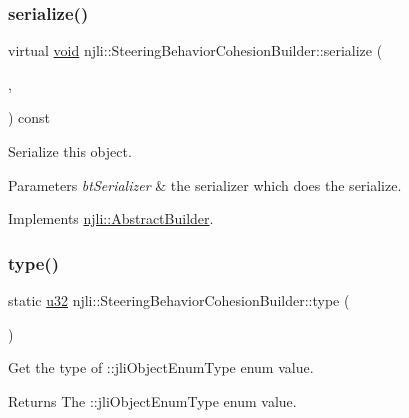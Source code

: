 \subsubsection{\texorpdfstring{serialize()}{serialize()}}
{\footnotesize\ttfamily virtual \mbox{\hyperlink{_thread_8h_af1e856da2e658414cb2456cb6f7ebc66}{void}} njli\+::\+Steering\+Behavior\+Cohesion\+Builder\+::serialize (\begin{DoxyParamCaption}\item[{\mbox{\hyperlink{_thread_8h_af1e856da2e658414cb2456cb6f7ebc66}{void}} $\ast$}]{,  }\item[{bt\+Serializer $\ast$}]{ }\end{DoxyParamCaption}) const\hspace{0.3cm}{\ttfamily [virtual]}}

Serialize this object.


\begin{DoxyParams}{Parameters}
{\em bt\+Serializer} & the serializer which does the serialize. \\
\hline
\end{DoxyParams}


Implements \mbox{\hyperlink{classnjli_1_1_abstract_builder_ab66b774e02ccb9da554c9aab7fa6d981}{njli\+::\+Abstract\+Builder}}.

\mbox{\label{classnjli_1_1_steering_behavior_cohesion_builder_a2269a31c758ecafce57ada527f1510c9}} 
\subsubsection{\texorpdfstring{type()}{type()}}
{\footnotesize\ttfamily static \mbox{\hyperlink{_util_8h_a10e94b422ef0c20dcdec20d31a1f5049}{u32}} njli\+::\+Steering\+Behavior\+Cohesion\+Builder\+::type (\begin{DoxyParamCaption}{ }\end{DoxyParamCaption})\hspace{0.3cm}{\ttfamily [static]}}

Get the type of \+::jli\+Object\+Enum\+Type enum value.

\begin{DoxyReturn}{Returns}
The \+::jli\+Object\+Enum\+Type enum value. 
\end{DoxyReturn}


